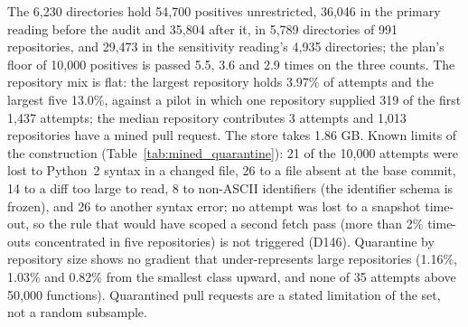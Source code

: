 \documentclass[10pt,twocolumn]{article}
\begin{document}
The 6,230 directories hold 54,700 positives unrestricted, 36,046 in the primary reading before the audit and 35,804 after it, in 5,789 directories of 991 repositories, and 29,473 in the sensitivity reading's 4,935 directories;
the plan's floor of 10,000 positives is passed 5.5, 3.6 and 2.9 times on the three counts. %
The repository mix is flat: the largest repository holds 3.97\% of attempts and the largest five 13.0\%, against a pilot in which one repository supplied 319 of the first 1,437 attempts; the median repository contributes 3 attempts and 1,013 repositories have a mined pull request. %
The store takes 1.86 GB. %
Known limits of the construction (Table~\ref{tab:mined_quarantine}): 21 of the 10,000 attempts were lost to Python~2 syntax in a changed file, 26 to a file absent at the base commit, 14 to a diff too large to read, 8 to non-ASCII identifiers (the identifier schema
is frozen), and 26 to another syntax error; no attempt was lost to a snapshot time-out, so the rule that would have scoped a second fetch pass (more than 2\% time-outs concentrated in five repositories) is not triggered (D146). %
Quarantine by repository size shows no gradient that under-represents large repositories (1.16\%, 1.03\% and 0.82\% from the smallest class upward, and none of 35 attempts above 50,000 functions). %
Quarantined pull requests are a stated limitation of the set, not a random subsample.



\end{document}
